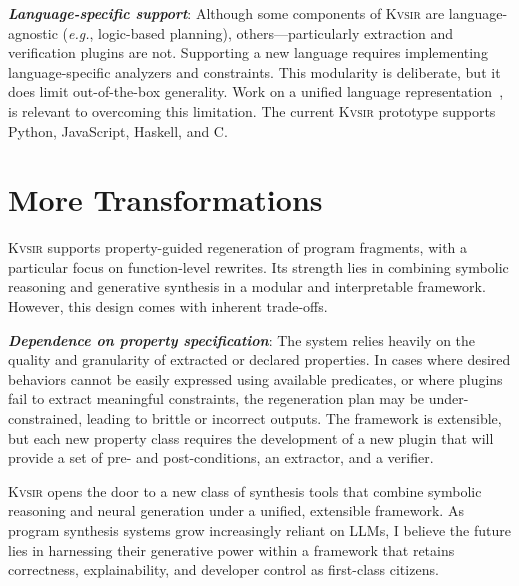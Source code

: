 \documentclass[sigplan,review,anonymous,10pt]{acmart}
\def\eg{{\em e.g.}, }
\newcommand{\sys}{{\scshape Kv{\textalpha}sir}\xspace}
\newcommand{\heading}[1]{\vspace{2pt}\noindent\textbf{\emph{#1}}:\enspace}
\begin{document}
\heading{Language-specific support}
Although some components of \sys are language-agnostic (\eg logic-based planning),
others---particularly extraction and verification plugins are not.
Supporting a new language
requires implementing language-specific analyzers and constraints.
This modularity is deliberate,
but it does limit out-of-the-box generality.
Work on a unified language representation~\cite{koppel2018onetool,bap2011,dillig2009sail},
is relevant to overcoming this limitation.
The current \sys prototype
supports Python, JavaScript, Haskell, and C. 



\section{More Transformations}
\label{sec:discussion}


\sys supports property-guided regeneration of program fragments, with a
particular focus on function-level rewrites. Its strength lies in combining
symbolic reasoning and generative synthesis in a modular and interpretable
framework. However, this design comes with inherent trade-offs.

\heading{Dependence on property specification}
The system relies heavily on the quality and granularity of extracted or declared properties.
In cases where desired behaviors cannot be easily expressed using available
predicates, or where plugins fail to extract meaningful constraints, the
regeneration plan may be under-constrained, leading to brittle or incorrect
outputs. The framework is extensible, but each new property class requires the
development of a new plugin that will provide a set of pre- and
post-conditions, an extractor, and a verifier.


\sys opens the door to a new class of synthesis tools that combine symbolic
reasoning and neural generation under a unified, extensible framework.
As program synthesis systems grow increasingly reliant on LLMs, I believe the
future lies in harnessing their generative power within a framework that retains
correctness, explainability, and developer control as first-class citizens.
\end{document}
